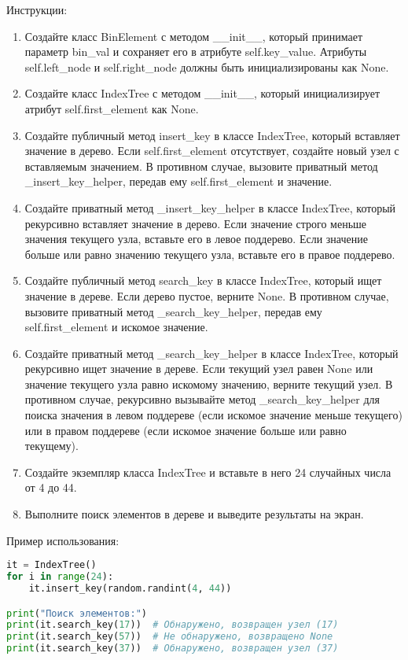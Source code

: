 \begin{enumerate}
Инструкции:
\begin{enumerate}
    \item Создайте класс BinElement с методом \_\_init\_\_, который принимает параметр bin\_val и сохраняет его в атрибуте self.key\_value. Атрибуты self.left\_node и self.right\_node должны быть инициализированы как None.
    \item Создайте класс IndexTree с методом \_\_init\_\_, который инициализирует атрибут self.first\_element как None.
    \item Создайте публичный метод insert\_key в классе IndexTree, который вставляет значение в дерево. Если self.first\_element отсутствует, создайте новый узел с вставляемым значением. В противном случае, вызовите приватный метод \_insert\_key\_helper, передав ему self.first\_element и значение.
    \item Создайте приватный метод \_insert\_key\_helper в классе IndexTree, который рекурсивно вставляет значение в дерево. Если значение строго меньше значения текущего узла, вставьте его в левое поддерево. Если значение больше или равно значению текущего узла, вставьте его в правое поддерево.
    \item Создайте публичный метод search\_key в классе IndexTree, который ищет значение в дереве. Если дерево пустое, верните None. В противном случае, вызовите приватный метод \_search\_key\_helper, передав ему self.first\_element и искомое значение.
    \item Создайте приватный метод \_search\_key\_helper в классе IndexTree, который рекурсивно ищет значение в дереве. Если текущий узел равен None или значение текущего узла равно искомому значению, верните текущий узел. В противном случае, рекурсивно вызывайте метод \_search\_key\_helper для поиска значения в левом поддереве (если искомое значение меньше текущего) или в правом поддереве (если искомое значение больше или равно текущему).
    \item Создайте экземпляр класса IndexTree и вставьте в него 24 случайных числа от 4 до 44.
    \item Выполните поиск элементов в дереве и выведите результаты на экран.
\end{enumerate}

Пример использования:
\begin{lstlisting}[language=Python]
it = IndexTree()
for i in range(24):
    it.insert_key(random.randint(4, 44))

print("Поиск элементов:")
print(it.search_key(17))  # Обнаружено, возвращен узел (17)
print(it.search_key(57))  # Не обнаружено, возвращено None
print(it.search_key(37))  # Обнаружено, возвращен узел (37)
\end{lstlisting}


\end{enumerate}
